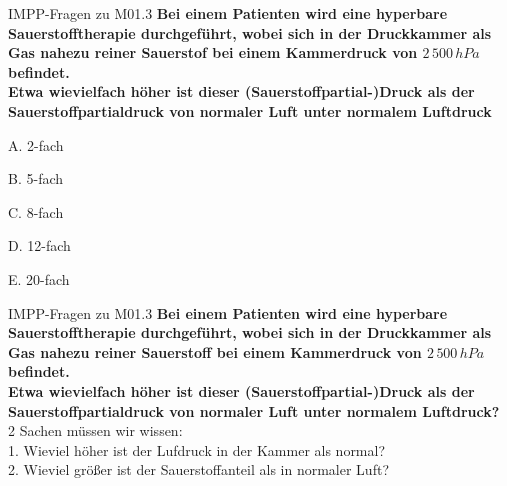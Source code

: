 \documentclass{beamer}
\begin{document}
\begin{frame}{IMPP-Fragen zu M01.3}
    \textbf{Bei einem Patienten wird eine hyperbare Sauerstofftherapie durchgeführt, wobei sich in der Druckkammer als Gas nahezu reiner Sauerstof bei einem Kammerdruck von \(2\,500\,hPa\) befindet. 
        } \\
        \textbf{
        Etwa wievielfach höher ist dieser (Sauerstoffpartial-)Druck als der Sauerstoffpartialdruck von normaler Luft unter normalem Luftdruck
        }\\[0.2 cm]

\begin{description}
\item{A.} 2-fach
\item{B.} 5-fach
\item{C.} 8-fach
\item{D.} 12-fach %
\item{E.} 20-fach

\end{description}
\end{frame}


\begin{frame}{IMPP-Fragen zu M01.3}
    \textbf{Bei einem Patienten wird eine hyperbare Sauerstofftherapie durchgeführt, wobei sich in der Druckkammer als Gas nahezu reiner Sauerstoff bei einem Kammerdruck von \(2\,500\,hPa\) befindet. 
        } \\
        \textbf{
        Etwa wievielfach höher ist dieser (Sauerstoffpartial-)Druck als der Sauerstoffpartialdruck von normaler Luft unter normalem Luftdruck?
        }\\[0.2 cm]

2 Sachen müssen wir wissen: \\
1. Wieviel höher ist der Lufdruck in der Kammer als normal? \\
2. Wieviel größer ist der Sauerstoffanteil als in normaler Luft? \\



\end{frame}
\end{document}

